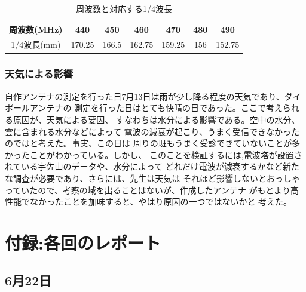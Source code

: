 \documentclass[dvipdfmx,autodetect-engine,titlepage]{jsarticle}
\begin{document}
\begin{table}[h]
  \centering
  \caption{周波数と対応する1/4波長}
  \begin{tabular}{|c||c|c|c|c|c|c|}
  \hline
  周波数(MHz)  & 440    & 450   & 460    & 470    & 480 & 490    \\ \hline
  1/4波長(mm) & 170.25 & 166.5 & 162.75 & 159.25 & 156 & 152.75 \\ \hline
  \end{tabular}
  \end{table}

\subsubsection*{天気による影響}

自作アンテナの測定を行った日7月13日は雨が少し降る程度の天気であり、ダイポールアンテナの
測定を行った日はとても快晴の日であった。ここで考えられる原因が、天気による要因、
すなわちは水分による影響である。空中の水分、雲に含まれる水分などによって
電波の減衰が起こり、うまく受信できなかったのではと考えた。事実、この日は
周りの班もうまく受診できていないことが多かったことがわかっている。しかし、
このことを検証するには,電波塔が設置されている宇佐山のデータや、水分によって
どれだけ電波が減衰するかなど新たな調査が必要であり、さらには、先生は天気は
それほど影響しないとおっしゃっていたので、考察の域を出ることはないが、作成したアンテナ
がもとより高性能でなかったことを加味すると、やはり原因の一つではないかと
考えた。

\section{付録:各回のレポート}

\subsection*{6月22日}
\end{document}
